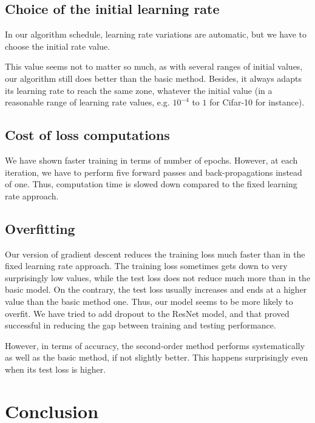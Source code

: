 \documentclass{article}
\begin{document}
  \subsection{Choice of the initial learning rate}
  
  In our algorithm schedule, learning rate variations are automatic, but we have to choose the initial rate value. 
  
  This value seems not to matter so much, as with several ranges of initial values, our algorithm still does better than the basic method. Besides, it always adapts its learning rate to reach the same zone, whatever the initial value (in a reasonable range of learning rate values, e.g. $10^{-4}$ to $1$ for Cifar-10 for instance).
  
  \subsection{Cost of loss computations}
  
  We have shown faster training in terms of number of epochs. However, at each iteration, we have to perform five forward passes and back-propagations instead of one. Thus, computation time is slowed down compared to the fixed learning rate approach. 
  
  \subsection{Overfitting}
  
  Our version of gradient descent reduces the training loss much faster than in the fixed learning rate approach. The training loss sometimes gets down to very surprisingly low values, while the test loss does not reduce much more than in the basic model. On the contrary, the test loss usually increases and ends at a higher value than the basic method one. Thus, our model seems to be more likely to overfit. We have tried to add dropout to the ResNet model, and that proved successful in reducing the gap between training and testing performance.
  
  However, in terms of accuracy, the second-order method performs systematically as well as the basic method, if not slightly better. This happens surprisingly even when its test loss is higher. 
  
  \section{Conclusion}
  
\end{document}
